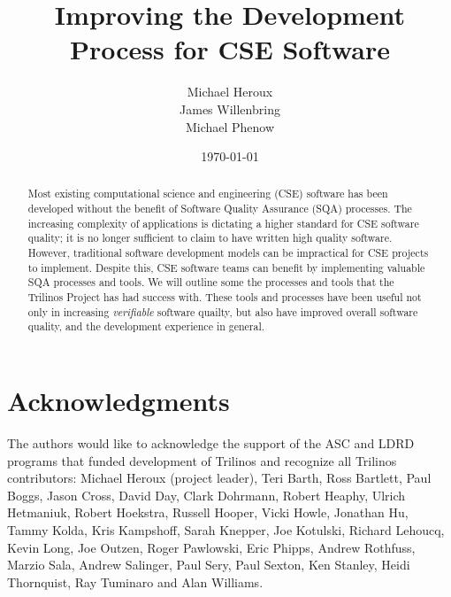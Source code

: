 \documentclass[12pt,relax]{article}
\title{Improving the Development Process for CSE Software}
\author{
Michael Heroux\\
James Willenbring\\
Michael Phenow\\
}
\date{\today} %
\begin{document}
\maketitle


\begin{abstract}

Most existing computational science and engineering (CSE) software has been 
developed without the benefit of Software Quality Assurance (SQA) processes.
The increasing complexity of applications is dictating a higher standard for 
CSE software quality; it is no longer sufficient to claim to have 
written high quality software.  However, traditional
software development models can be impractical for CSE projects to implement.
Despite this, CSE software teams can benefit by implementing
valuable SQA processes and tools.  We will outline some the
processes and tools that the Trilinos Project has had success with.  These 
tools and processes have been useful not only in increasing 
\textit{verifiable} software quailty, but also have improved 
overall software quality, and the development experience in 
general.

\end{abstract}

\clearpage


\section*{Acknowledgments}

The authors would like to acknowledge the support of the ASC and LDRD programs 
that funded development of Trilinos and recognize all Trilinos contributors:
Michael Heroux (project leader), Teri Barth, Ross Bartlett, Paul Boggs, Jason
Cross, David Day, Clark Dohrmann, Robert Heaphy, Ulrich Hetmaniuk, Robert
Hoekstra, Russell Hooper, Vicki Howle, Jonathan Hu, Tammy Kolda, Kris
Kampshoff, Sarah Knepper, Joe Kotulski, Richard Lehoucq, Kevin Long, Joe
Outzen, Roger Pawlowski, Eric Phipps, Andrew Rothfuss, Marzio Sala, Andrew
Salinger, Paul Sery, Paul Sexton, Ken Stanley, Heidi Thornquist, Ray Tuminaro
and Alan Williams.

\clearpage
\tableofcontents

\clearpage
\end{document}
